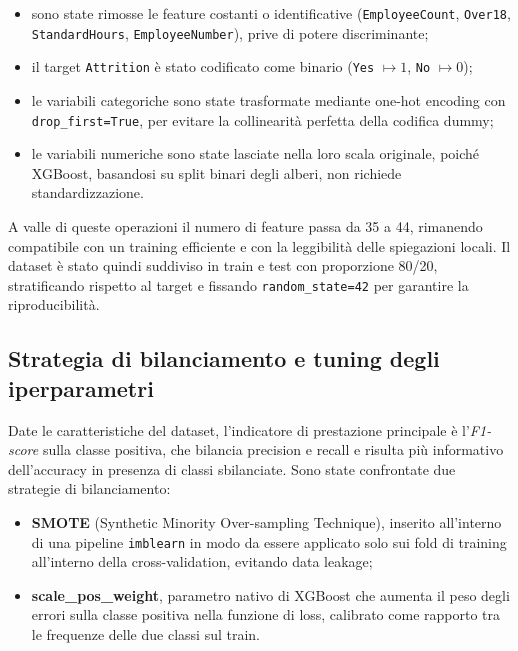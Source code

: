 \begin{itemize}
    \item sono state rimosse le feature costanti o identificative (\texttt{EmployeeCount}, \texttt{Over18}, \texttt{StandardHours}, \texttt{EmployeeNumber}), prive di potere discriminante;
    \item il target \texttt{Attrition} è stato codificato come binario (\texttt{Yes} $\mapsto 1$, \texttt{No} $\mapsto 0$);
    \item le variabili categoriche sono state trasformate mediante one-hot encoding con \texttt{drop\_first=True}, per evitare la collinearità perfetta della codifica dummy;
    \item le variabili numeriche sono state lasciate nella loro scala originale, poiché XGBoost, basandosi su split binari degli alberi, non richiede standardizzazione.
\end{itemize}

A valle di queste operazioni il numero di feature passa da \num{35} a \num{44}, rimanendo compatibile con un training efficiente e con la leggibilità delle spiegazioni locali. Il dataset è stato quindi suddiviso in train e test con proporzione 80/20, stratificando rispetto al target e fissando \texttt{random\_state=42} per garantire la riproducibilità.

\subsection{Strategia di bilanciamento e tuning degli iperparametri}

Date le caratteristiche del dataset, l'indicatore di prestazione principale è l'\emph{F1-score} sulla classe positiva, che bilancia precision e recall e risulta più informativo dell'accuracy in presenza di classi sbilanciate. Sono state confrontate due strategie di bilanciamento:

\begin{itemize}
    \item \textbf{SMOTE} (Synthetic Minority Over-sampling Technique), inserito all'interno di una pipeline \texttt{imblearn} in modo da essere applicato solo sui fold di training all'interno della cross-validation, evitando data leakage;
    \item \textbf{scale\_pos\_weight}, parametro nativo di XGBoost che aumenta il peso degli errori sulla classe positiva nella funzione di loss, calibrato come rapporto tra le frequenze delle due classi sul train.
\end{itemize}

